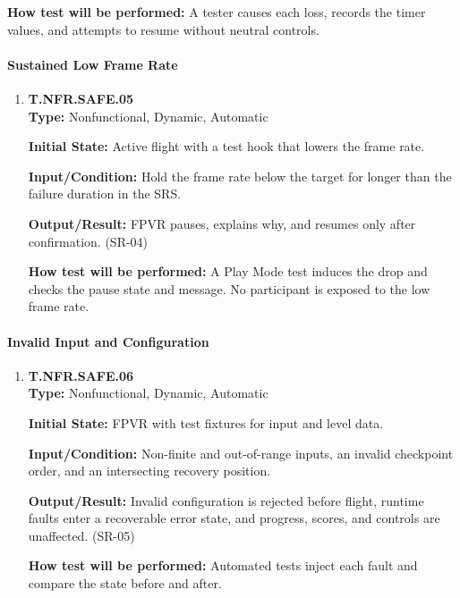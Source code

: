 \documentclass[12pt, titlepage]{article}
\begin{document}
{\begin{enumerate}
\textbf{How test will be performed:} A tester causes each loss, records the timer
values, and attempts to resume without neutral controls.

\end{enumerate}

\paragraph{Sustained Low Frame Rate}

\begin{enumerate}

\item{\hypertarget{test-nfr-safe-05}{}\textbf{T.NFR.SAFE.05}\\}
\textbf{Type:} Nonfunctional, Dynamic, Automatic

\textbf{Initial State:} Active flight with a test hook that lowers the frame rate.

\textbf{Input/Condition:} Hold the frame rate below the target for longer than the
failure duration in the SRS.

\textbf{Output/Result:} FPVR pauses, explains why, and resumes only after confirmation.
(\mbox{SR-04})

\textbf{How test will be performed:} A Play Mode test induces the drop and checks the
pause state and message. No participant is exposed to the low frame rate.

\end{enumerate}

\paragraph{Invalid Input and Configuration}

\begin{enumerate}

\item{\hypertarget{test-nfr-safe-06}{}\textbf{T.NFR.SAFE.06}\\}
\textbf{Type:} Nonfunctional, Dynamic, Automatic

\textbf{Initial State:} FPVR with test fixtures for input and level data.

\textbf{Input/Condition:} Non-finite and out-of-range inputs, an invalid checkpoint
order, and an intersecting recovery position.

\textbf{Output/Result:} Invalid configuration is rejected before flight, runtime faults
enter a recoverable error state, and progress, scores, and controls are unaffected.
(\mbox{SR-05})

\textbf{How test will be performed:} Automated tests inject each fault and compare the
state before and after.

\end{enumerate}
\par}
\end{document}
